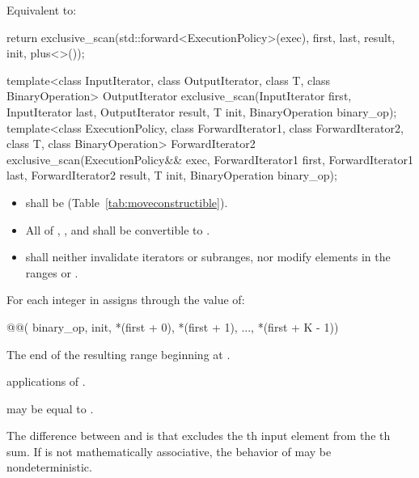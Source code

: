 \begin{itemdescr}
\pnum
\effects Equivalent to:
\begin{codeblock}
return exclusive_scan(std::forward<ExecutionPolicy>(exec),
                      first, last, result, init, plus<>());
\end{codeblock}
\end{itemdescr}


%
\begin{itemdecl}
template<class InputIterator, class OutputIterator, class T, class BinaryOperation>
  OutputIterator exclusive_scan(InputIterator first, InputIterator last,
                                OutputIterator result,
                                T init, BinaryOperation binary_op);
template<class ExecutionPolicy,
         class ForwardIterator1, class ForwardIterator2, class T, class BinaryOperation>
  ForwardIterator2 exclusive_scan(ExecutionPolicy&& exec,
                                  ForwardIterator1 first, ForwardIterator1 last,
                                  ForwardIterator2 result,
                                  T init, BinaryOperation binary_op);
\end{itemdecl}

\begin{itemdescr}
\pnum
\requires
\begin{itemize}
\item {} shall be  (Table~\ref{tab:moveconstructible}).
\item All of , ,
and  shall be convertible to .
\item {} shall neither invalidate iterators or subranges, nor modify
elements in the ranges  or .
\end{itemize}

\pnum
\effects
For each integer  in 
assigns through  the value of:
\begin{codeblock}
@@(
    binary_op, init, *(first + 0), *(first + 1), ..., *(first + K - 1))
\end{codeblock}

\pnum
\returns
The end of the resulting range beginning at .

\pnum
\complexity
{} applications of .

\pnum
\remarks
{} may be equal to .

\pnum
\begin{note}
The difference between  and  is
that  excludes the th input element from the
th sum. If  is not mathematically associative, the
behavior of  may be nondeterministic.
\end{note}
\end{itemdescr}

